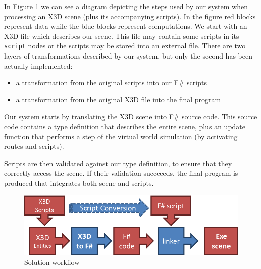 
In Figure \ref{fig:solution_workflow} we can see a diagram depicting the steps used by our system when processing an X3D scene (plus its accompanying scripts). In the figure red blocks represent data while the blue blocks represent computations.
We start with an X3D file which describes our scene. This file may contain some scripts in its \texttt{script} nodes or the scripts may be stored into an external file. There are two layers of transformations described by our system, but only the second has been actually implemented:
\begin{itemize}
\item a transformation from the original scripts into our F\# scripts
\item a transformation from the original X3D file into the final program
\end{itemize}

Our system starts by translating the X3D scene into F\# source code. This source code contains a type definition that describes the entire scene, plus an update function that performs a step of the virtual world simulation (by activating routes and scripts).

Scripts are then validated against our type definition, to ensure that they correctly access the scene. If their validation succeeeds, the final program is produced that integrates both scene and scripts.

\begin{figure}
\begin{center}
\includegraphics[scale=1.0]{Solution_workflow.png}
\end{center}
\label{fig:solution_workflow}
\caption{Solution workflow}
\end{figure}

